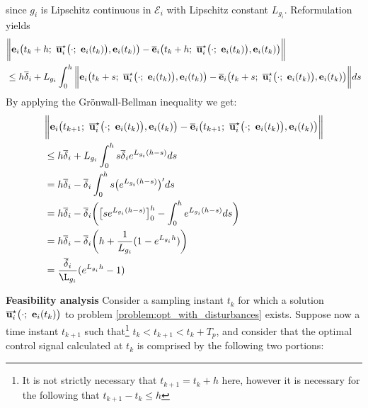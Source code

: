 \begin{gg_box}
\begin{align}
\end{align}
since $g_i$ is Lipschitz continuous in $\mathcal{E}_i$ with Lipschitz constant
$L_{g_i}$. Reformulation yields
\begin{align}
  &\bigg\| \vect{e}_i\big(t_k+h;\ \overline{\vect{u}}_i^{\star}\big(\cdot;\ \vect{e}_i(t_k)\big), \vect{e}_i(t_k)\big) -
  \overline{\vect{e}}_i\big(t_k+h;\ \overline{\vect{u}}_i^{\star}\big(\cdot;\ \vect{e}_i(t_k)\big), \vect{e}_i(t_k)\big) \bigg\| \\
  &\leq h \overline{\delta}_i
     + L_{g_i} \int_{0}^{h} \bigg\| \vect{e}_i\big(t_k + s;\ \overline{\vect{u}}_i^{\star}\big(\cdot;\ \vect{e}_i(t_k)\big), \vect{e}_i(t_k)\big) -
  \overline{\vect{e}}_i\big(t_k + s;\ \overline{\vect{u}}_i^{\star}\big(\cdot;\ \vect{e}_i(t_k)\big), \vect{e}_i(t_k)\big) \bigg\| ds \\
\end{align}
By applying the Gr\"{o}nwall-Bellman inequality we get:
\begin{align}
  &\bigg\| \vect{e}_i\big(t_{k+1};\ \overline{\vect{u}}_i^{\star}\big(\cdot;\ \vect{e}_i(t_k)\big), \vect{e}_i(t_k)\big) -
    \overline{\vect{e}}_i\big(t_{k+1};\ \overline{\vect{u}}_i^{\star}\big(\cdot;\ \vect{e}_i(t_k)\big), \vect{e}_i(t_k)\big) \bigg\| \\
  &\leq h \overline{\delta}_i +  L_{g_i} \int_{0}^{h} s \overline{\delta}_i e^{L_{g_i}(h - s)} ds \\
  &= h \overline{\delta}_i - \overline{\delta}_i \int_{0}^{h} s  \big(e^{L_{g_i}(h - s)}\big)' ds \\
  &= h \overline{\delta}_i -
    \overline{\delta}_i \bigg( \big[s e^{L_{g_i}(h - s)}\big]_0^h
      - \int_{0}^{h} e^{L_{g_i}(h - s)}ds\bigg) \\
  &= h \overline{\delta}_i - \overline{\delta}_i \bigg( h + \dfrac{1}{L_{g_i}} (1- e^{L_{g_i}h})\bigg) \\
  &= \dfrac{\overline{\delta}_i}{\L_{g_i}} (e^{L_{g_i}h} - 1)
\end{align}
\qedsymbol
\end{gg_box}


\textbf{Feasibility analysis}
Consider a sampling instant $t_k$ for which a
solution $\overline{\vect{u}}_i^{\star}\big(\cdot;\ \vect{e}_i(t_k)\big)$ to
problem \eqref{problem:opt_with_disturbances} exists.
Suppose now a time instant $t_{k+1}$ such that\footnote{It is not strictly necessary
that $t_{k+1} = t_k + h$ here, however it is necessary for the following that
$t_{k+1} - t_k \leq h$} $t_k < t_{k+1} < t_k + T_p$, and consider that the
optimal control signal calculated at $t_k$ is comprised by the following two
portions:

